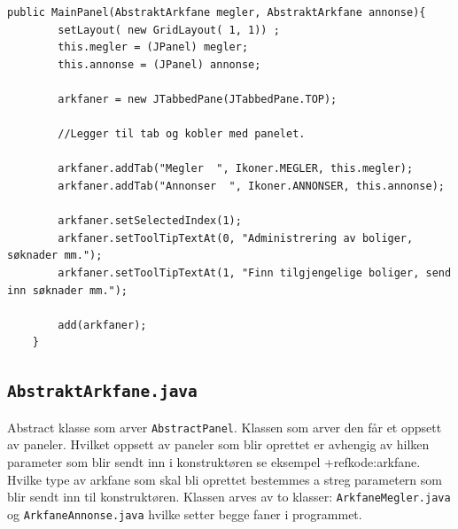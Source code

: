 \begin{lstlisting}[caption=Kontruktør i \texttt{MainPanel.java}, label=kode:main_panel]
    public MainPanel(AbstraktArkfane megler, AbstraktArkfane annonse){
        setLayout( new GridLayout( 1, 1)) ;
        this.megler = (JPanel) megler;
        this.annonse = (JPanel) annonse;
        
        arkfaner = new JTabbedPane(JTabbedPane.TOP);
        
        //Legger til tab og kobler med panelet.
        
        arkfaner.addTab("Megler  ", Ikoner.MEGLER, this.megler);
        arkfaner.addTab("Annonser  ", Ikoner.ANNONSER, this.annonse);
        
        arkfaner.setSelectedIndex(1);
        arkfaner.setToolTipTextAt(0, "Administrering av boliger, søknader mm.");
        arkfaner.setToolTipTextAt(1, "Finn tilgjengelige boliger, send inn søknader mm.");
        
        add(arkfaner);
    }
\end{lstlisting}



\subsection{\texttt{AbstraktArkfane.java}}
Abstract klasse som arver \texttt{AbstractPanel}. Klassen som arver den får et oppsett av paneler. Hvilket oppsett av paneler som blir oprettet er avhengig av hilken parameter som blir sendt inn i konstruktøren se eksempel +ref{kode:arkfane}. Hvilke type av arkfane som skal bli oprettet bestemmes a streg parametern som blir sendt inn til konstruktøren. Klassen arves av to klasser: \texttt{ArkfaneMegler.java} og \texttt{ArkfaneAnnonse.java} hvilke setter begge faner i programmet. 

